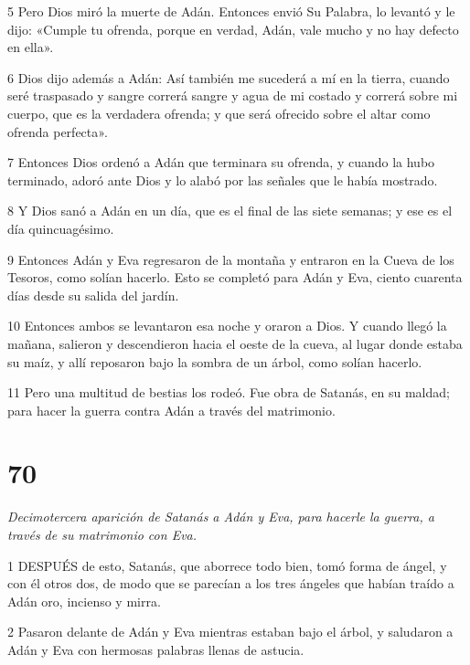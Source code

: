 \par 5 Pero Dios miró la muerte de Adán. Entonces envió Su Palabra, lo levantó y le dijo: «Cumple tu ofrenda, porque en verdad, Adán, vale mucho y no hay defecto en ella».

\par 6 Dios dijo además a Adán: Así también me sucederá a mí en la tierra, cuando seré traspasado y sangre correrá sangre y agua de mi costado y correrá sobre mi cuerpo, que es la verdadera ofrenda; y que será ofrecido sobre el altar como ofrenda perfecta».

\par 7 Entonces Dios ordenó a Adán que terminara su ofrenda, y cuando la hubo terminado, adoró ante Dios y lo alabó por las señales que le había mostrado.

\par 8 Y Dios sanó a Adán en un día, que es el final de las siete semanas; y ese es el día quincuagésimo.

\par 9 Entonces Adán y Eva regresaron de la montaña y entraron en la Cueva de los Tesoros, como solían hacerlo. Esto se completó para Adán y Eva, ciento cuarenta días desde su salida del jardín.

\par 10 Entonces ambos se levantaron esa noche y oraron a Dios. Y cuando llegó la mañana, salieron y descendieron hacia el oeste de la cueva, al lugar donde estaba su maíz, y allí reposaron bajo la sombra de un árbol, como solían hacerlo.

\par 11 Pero una multitud de bestias los rodeó. Fue obra de Satanás, en su maldad; para hacer la guerra contra Adán a través del matrimonio.

\chapter{70}

\par \textit{Decimotercera aparición de Satanás a Adán y Eva, para hacerle la guerra, a través de su matrimonio con Eva.}

\par 1 DESPUÉS de esto, Satanás, que aborrece todo bien, tomó forma de ángel, y con él otros dos, de modo que se parecían a los tres ángeles que habían traído a Adán oro, incienso y mirra.

\par 2 Pasaron delante de Adán y Eva mientras estaban bajo el árbol, y saludaron a Adán y Eva con hermosas palabras llenas de astucia.

